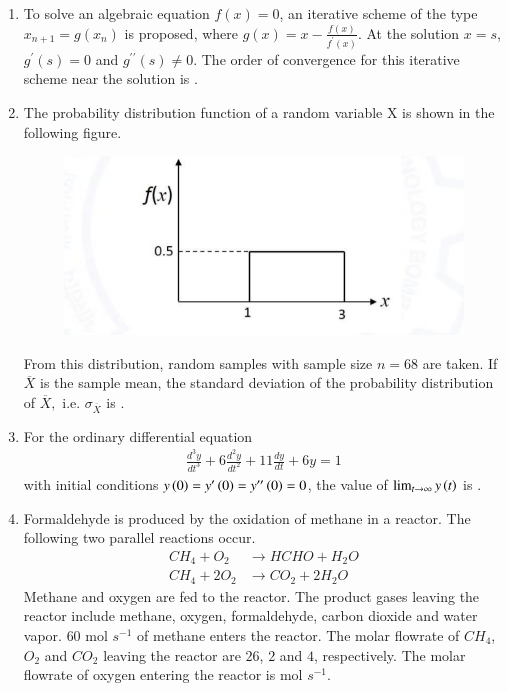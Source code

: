 \documentclass[journal,12pt,onecolumn]{IEEEtran}
\theoremstyle{remark}
\begin{document}
\begin{enumerate}
\item To solve an algebraic equation $f(x)=0$, an iterative scheme of the type $x_{n+1}=g(x_{n})$ is proposed, where $g(x)=x-\frac{f(x)}{f^{\prime}(x)}$. At the solution $x=s$, $g^{\prime}(s)=0$ and $g^{\prime\prime}(s)\ne0$. The order of convergence for this iterative scheme near the solution is \underline{\hspace{2cm}}.
\hfill{}

 

\item The probability distribution function of a random variable X is shown in the following figure.
\begin{figure}[H]
\centering
\includegraphics[width = 0.5\columnwidth]{q35.png}
\caption*{}
\label{fig:q35}
\end{figure}
From this distribution, random samples with sample size $n=68$ are taken. If $\overline{X}$ is the sample mean, the standard deviation of the probability distribution of $\overline{X},$ i.e. $\sigma_{\overline{X}}$ is \underline{\hspace{2cm}} .
\hfill{}

 

\item For the ordinary differential equation
\begin{align*}
\frac{d^{3}y}{dt^{3}}+6\frac{d^{2}y}{dt^{2}}+11\frac{dy}{dt}+6y=1
\end{align*}
with initial conditions $y\left(0\right)=y^{\prime}\left(0\right)=y^{\prime\prime}\left(0\right)=0$, the value of $\lim_{t\rightarrow\infty}y\left(t\right)$ is \underline{\hspace{2cm}} .
\hfill{}

 

\item Formaldehyde is produced by the oxidation of methane in a reactor. The following two parallel reactions occur.
\begin{align*}
CH_{4}+O_{2}&\longrightarrow HCHO+H_{2}O \\
CH_{4}+2O_{2}&\longrightarrow CO_{2}+2H_{2}O
\end{align*}
Methane and oxygen are fed to the reactor. The product gases leaving the reactor include methane, oxygen, formaldehyde, carbon dioxide and water vapor. $60$ mol $s^{-1}$ of methane enters the reactor. The molar flowrate  of $CH_{4}$, $O_{2}$ and $CO_{2}$ leaving the reactor are $26$, $2$ and $4$, respectively. The molar flowrate of oxygen entering the reactor is \underline{\hspace{2cm}} mol $s^{-1}.$
\hfill{}


\end{enumerate}
\end{document}
